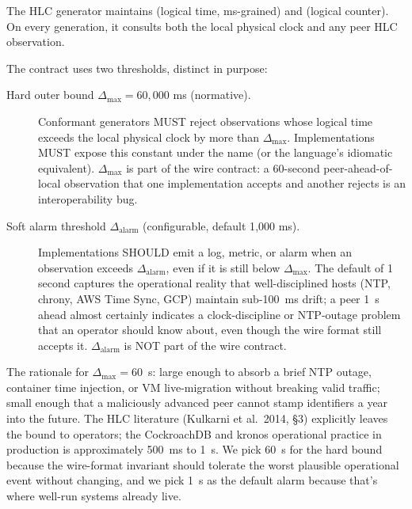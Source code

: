 The HLC generator maintains  (logical time, ms-grained) and  (logical counter). On every generation, it consults both the local physical clock and any peer HLC observation.

The contract uses two thresholds, distinct in purpose:

\begin{description}
  \item[Hard outer bound $\Delta_{\max} = 60{,}000$ ms (normative).] Conformant generators MUST reject observations whose logical time exceeds the local physical clock by more than $\Delta_{\max}$. Implementations MUST expose this constant under the name  (or the language's idiomatic equivalent). $\Delta_{\max}$ is part of the wire contract: a 60-second peer-ahead-of-local observation that one implementation accepts and another rejects is an interoperability bug.
  \item[Soft alarm threshold $\Delta_{\text{alarm}}$ (configurable, default 1{,}000 ms).] Implementations SHOULD emit a log, metric, or alarm when an observation exceeds $\Delta_{\text{alarm}}$, even if it is still below $\Delta_{\max}$. The default of 1 second captures the operational reality that well-disciplined hosts (NTP, chrony, AWS Time Sync, GCP) maintain sub-100~ms drift; a peer 1~s ahead almost certainly indicates a clock-discipline or NTP-outage problem that an operator should know about, even though the wire format still accepts it. $\Delta_{\text{alarm}}$ is NOT part of the wire contract.
\end{description}

\noindent The rationale for $\Delta_{\max} = 60$~s: large enough to absorb a brief NTP outage, container time injection, or VM live-migration without breaking valid traffic; small enough that a maliciously advanced peer cannot stamp identifiers a year into the future. The HLC literature (Kulkarni et al.~2014, \S3) explicitly leaves the bound to operators; the CockroachDB and kronos operational practice in production is approximately 500~ms to 1~s. We pick 60~s for the hard bound because the wire-format invariant should tolerate the worst plausible operational event without changing, and we pick 1~s as the default alarm because that's where well-run systems already live.

